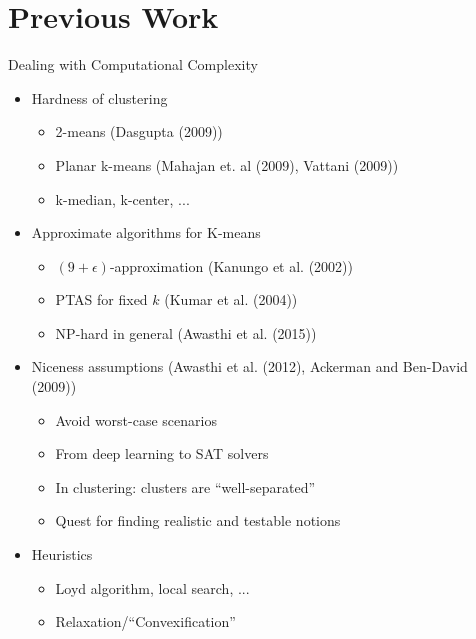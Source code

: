 \documentclass{beamer}
\begin{document}
\section{Previous Work}

\begin{frame}{Dealing with Computational Complexity}
  \begin{itemize}
  
    \item Hardness of clustering
    \begin{itemize}
        \item 2-means (Dasgupta (2009))
        \item Planar k-means (Mahajan et. al (2009), Vattani (2009))
        \item k-median, k-center, ...
    \end{itemize}
    \pause
    \item Approximate algorithms for K-means
    \begin{itemize}
        \item $(9+\epsilon)$-approximation (Kanungo et al. (2002))
        \item PTAS for fixed $k$ (Kumar et al. (2004))
        \item NP-hard in general (Awasthi et al. (2015))
    \end{itemize}
    
    \pause
    \item Niceness assumptions (Awasthi et al. (2012), Ackerman and Ben-David (2009))
    \begin{itemize}
        \item Avoid worst-case scenarios
        \item From deep learning to SAT solvers
        \item In clustering: clusters are ``well-separated''
        \item Quest for finding realistic and testable notions
    \end{itemize}
    
    \pause
    \item Heuristics
        \begin{itemize}
            \item Loyd algorithm, local search, ...
            \item Relaxation/``Convexification''
        \end{itemize}
        
        
  \end{itemize}
\end{frame}
\end{document}
